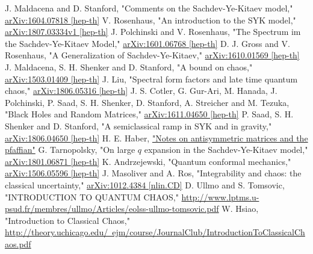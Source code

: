 \begin{thebibliography}{99}
		J. Maldacena and D. Stanford,
		"Comments on the Sachdev-Ye-Kitaev model,"
		\href{https://arxiv.org/pdf/1604.07818.pdf}{arXiv:1604.07818 [hep-th]}
		V. Rosenhaus,
		"An introduction to the SYK model,"
		\href{https://arxiv.org/pdf/1807.03334.pdf}{arXiv:1807.03334v1 [hep-th]}
		J. Polchinski and V. Rosenhaus,
		"The Spectrum im the Sachdev-Ye-Kitaev Model,"
		\href{https://arxiv.org/pdf/1601.06768.pdf}{arXiv:1601.06768 [hep-th]}
		D. J. Gross and V. Rosenhaus,
		"A Generalization of Sachdev-Ye-Kitaev,"
		\href{https://arxiv.org/pdf/1610.01569.pdf}{arXiv:1610.01569 [hep-th]}
		J. Maldacena, S. H. Shenker and D. Stanford,
		"A bound on chaos,"
		\href{https://arxiv.org/pdf/1503.01409.pdf}{arXiv:1503.01409 [hep-th]}
		J. Liu,
		"Spectral form factors and late time quantum chaos,"
		\href{https://arxiv.org/pdf/1806.05316.pdf}{arXiv:1806.05316 [hep-th]}
		J. S. Cotler, G. Gur-Ari, M. Hanada, J. Polchinski, P. Saad, S. H. Shenker,
		D. Stanford, A. Streicher and M. Tezuka,
		"Black Holes and Random Matrices,"
		\href{https://arxiv.org/pdf/1611.04650.pdf}{arXiv:1611.04650 [hep-th]}
		P. Saad, S. H. Shenker and D. Stanford,
		"A semiclassical ramp in SYK and in gravity,"
		\href{https://arxiv.org/pdf/1806.06840.pdf}{arXiv:1806.04650 [hep-th]}
	H. E. Haber,
	\href{http://scipp.ucsc.edu/~haber/webpage/pfaffian2.pdf}{"Notes on antisymmetric matrices and the pfaffian"}
		G. Tarnopolsky,
		"On large $q$ expansion in the Sachdev-Ye-Kitaev model,"
		\href{https://arxiv.org/pdf/1801.06871.pdf}{arXiv:1801.06871 [hep-th]}
		K. Andrzejewski,
		"Quantum conformal mechanics,"
		\href{https://arxiv.org/pdf/1506.05596.pdf}{arXiv:1506.05596 [hep-th]}
	J. Masoliver and A. Ros,
	"Integrability and chaos: the classical uncertainty,"
	\href{https://arxiv.org/pdf/1012.4384.pdf}{arXiv:1012.4384 [nlin.CD]}
	D. Ullmo and S. Tomsovic,
	"INTRODUCTION TO QUANTUM CHAOS,"
	\href{http://www.lptms.u-psud.fr/membres/ullmo/Articles/eolss-ullmo-tomsovic.pdf}{http://www.lptms.u-psud.fr/membres/ullmo/Articles/eolss-ullmo-tomsovic.pdf}
	W. Hsiao,
	"Introduction to Classical Chaos,"
	\href{http://theory.uchicago.edu/~ejm/course/JournalClub/IntroductionToClassicalChaos.pdf}{http://theory.uchicago.edu/~ejm/course/JournalClub/IntroductionToClassicalChaos.pdf}

\end{thebibliography}

